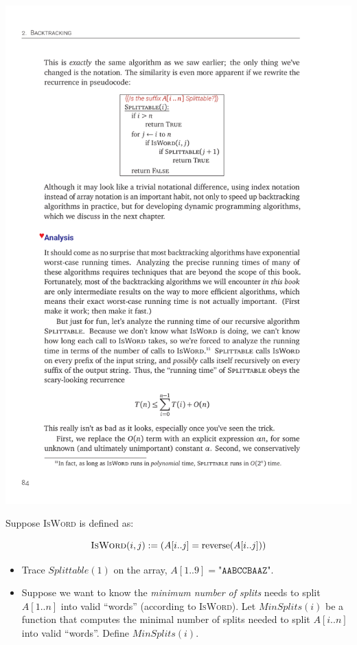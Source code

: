 \documentclass[12pt]{article}
\begin{document}
\includegraphics{w05-splittable-pc.pdf}

Suppose \textsc{IsWord} is defined as:

\[
\textsc{IsWord}(i,j) := (A[i..j] = \textrm{reverse}(A[i..j]))
\]

\begin{itemize}
  \item Trace $Splittable(1)$ on the array, $A[1..9] = \texttt{"AABCCBAAZ"}$.
  \vspace{2in}
  \item Suppose we want to know the \emph{minimum number of splits} needs to split $A[1..n]$ into valid ``words'' (according to \textsc{IsWord}). Let $MinSplits(i)$ be a function that computes the minimal number of splits needed to split $A[i..n]$ into valid ``words''. Define $MinSplits(i)$.
\end{itemize}
\end{document}
